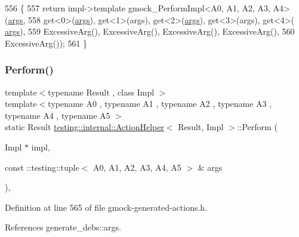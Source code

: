 \begin{DoxyCode}
556                  \{
557     \textcolor{keywordflow}{return} impl->template gmock\_PerformImpl<A0, A1, A2, A3, A4>(\hyperlink{namespacegenerate__debs_a75f9143e38df82d83b2e8a6f99cae02c}{args},
558         get<0>(\hyperlink{namespacegenerate__debs_a75f9143e38df82d83b2e8a6f99cae02c}{args}), get<1>(args), get<2>(\hyperlink{namespacegenerate__debs_a75f9143e38df82d83b2e8a6f99cae02c}{args}), get<3>(args), get<4>(
      \hyperlink{namespacegenerate__debs_a75f9143e38df82d83b2e8a6f99cae02c}{args}),
559         ExcessiveArg(), ExcessiveArg(), ExcessiveArg(), ExcessiveArg(),
560         ExcessiveArg());
561   \}
\end{DoxyCode}
\mbox{\label{classtesting_1_1internal_1_1ActionHelper_a58e3b1699dd3a4404ed2cd652327d8ca}} 
\subsubsection{\texorpdfstring{Perform()}{Perform()}\hspace{0.1cm}{\footnotesize\ttfamily [7/11]}}
{\footnotesize\ttfamily template$<$typename Result , class Impl $>$ \\
template$<$typename A0 , typename A1 , typename A2 , typename A3 , typename A4 , typename A5 $>$ \\
static Result \hyperlink{classtesting_1_1internal_1_1ActionHelper}{testing\+::internal\+::\+Action\+Helper}$<$ Result, Impl $>$\+::Perform (\begin{DoxyParamCaption}\item[{Impl $\ast$}]{impl,  }\item[{const \+::testing\+::tuple$<$ A0, A1, A2, A3, A4, A5 $>$ \&}]{args }\end{DoxyParamCaption})\hspace{0.3cm}{\ttfamily [inline]}, {\ttfamily [static]}}



Definition at line 565 of file gmock-\/generated-\/actions.\+h.



References generate\+\_\+debs\+::args.


